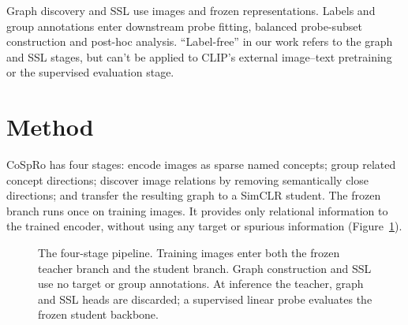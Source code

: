 \documentclass{article}
\begin{document}
Graph discovery and SSL use images and frozen representations. Labels and group annotations enter downstream probe fitting, balanced probe-subset construction and post-hoc analysis. ``Label-free'' in our work refers to the graph and SSL stages, but can't be applied to CLIP's external image--text pretraining or the supervised evaluation stage.

\section{Method}
CoSpRo has four stages: encode images as sparse named concepts; group related concept directions; discover image relations by removing semantically close directions; and transfer the resulting graph to a SimCLR student. The frozen branch runs once on training images. It provides only relational information to the trained encoder, without using any target or spurious information (Figure~\ref{fig:architecture}).

\begin{figure}[htbp]
\centering
{}
\caption{The four-stage pipeline. Training images enter both the frozen teacher branch and the student branch. Graph construction and SSL use no target or group annotations. At inference the teacher, graph and SSL heads are discarded; a supervised linear probe evaluates the frozen student backbone.}
\label{fig:architecture}
\end{figure}
\end{document}
